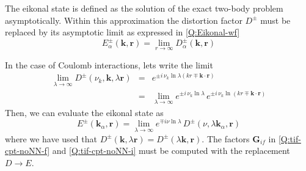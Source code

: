 The eikonal state is defined as the solution of the exact two-body
problem asymptotically. Within this approximation the distortion factor
$D^{\pm}$ must be replaced by its asymptotic limit as expressed in
\ref{Q:Eikonal-wf}
\[
E^{\pm}_{\alpha}(\bm{k},\bm{r}) = \lim_{r \to \infty}
D^{\pm}_{\alpha}(\bm{k},\bm{r})
\]

In the case of Coulomb interactions, lets write the limit
\begin{eqnarray*}
\lim_{\lambda \to \infty} D^{\pm}(\nu_{k}, \bm{k},\lambda \bm{r}) &=&
e^{{\pm} i \, \nu_{k} \ln{\lambda \left( k r \mp \bm{k}\cdot \bm{r}
\right)}}
\\
&=& \lim_{\lambda \to \infty} e^{\pm i \, \nu_{k} \ln{\lambda}}
\, e^{ \pm i \, \nu_{k} \ln{\left( k r \mp \bm{k} \cdot \bm{r}
\right)}}
\end{eqnarray*}
%
Then, we can evaluate the eikonal state as
%
\begin{equation}\label{Q:Eikonal-wf-Coul}
E^{\pm} (\bm{k}_{\alpha}, \bm{r}) = \lim_{\lambda \to \infty} e^{\mp
i \nu \ln{ \lambda}} \, D^{\pm}(\nu , \lambda \bm{k}_{\alpha}, \bm{r})
\end{equation}
where we have used that $D^{\pm} (\bm{k},\lambda \bm{r})= D^{\pm} (\lambda
\bm{k}, \bm{r})$.
%
The factors $\bm{G}_{if}$ in \ref{Q:tif-cpt-noNN-f} and
\ref{Q:tif-cpt-noNN-i} must be computed with the replacement $D \to E$.

